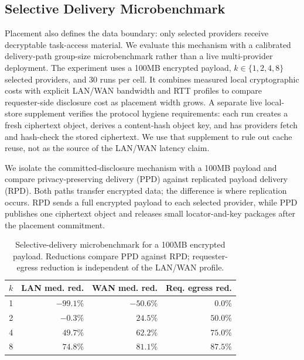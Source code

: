 \documentclass[sigplan,screen,review,anonymous]{acmart}
\begin{document}
\subsection{Selective Delivery Microbenchmark}
\label{subsec:eval-delivery}

Placement also defines the data boundary: only selected providers receive
decryptable task-access material. We evaluate this mechanism with a calibrated
delivery-path group-size microbenchmark rather than a live multi-provider
deployment. The experiment uses a 100MB encrypted payload,
\(k\in\{1,2,4,8\}\) selected providers, and 30 runs per cell. It combines
measured local cryptographic costs with explicit LAN/WAN bandwidth and RTT
profiles to compare requester-side disclosure cost as placement width grows.
A separate live local-store
supplement verifies the protocol hygiene requirements: each run creates a
fresh ciphertext object, derives a content-hash object key, and has providers
fetch and hash-check the stored ciphertext. We use that supplement to rule out
cache reuse, not as the source of the LAN/WAN latency claim.

We isolate the committed-disclosure mechanism with a 100MB payload and compare
privacy-preserving delivery (PPD) against replicated payload delivery (RPD).
Both paths transfer encrypted data; the difference is where replication
occurs. RPD sends a full encrypted payload to each selected provider, while
PPD publishes one ciphertext object and releases small locator-and-key
packages after the placement commitment.

\begin{table}[t]
\centering
\caption{Selective-delivery microbenchmark for a 100MB encrypted payload. Reductions compare PPD against RPD; requester-egress reduction is independent of the LAN/WAN profile.}
\label{tab:delivery-sweep}
\scriptsize
\setlength{\tabcolsep}{4.5pt}
\begin{tabular}{rrrr}
\toprule
\textbf{\(k\)} & \textbf{LAN med. red.} & \textbf{WAN med. red.} & \textbf{Req. egress red.} \\
\midrule
1 & \(-99.1\%\) & \(-50.6\%\) & \(0.0\%\) \\
2 & \(-0.3\%\) & \(24.5\%\) & \(50.0\%\) \\
4 & \(49.7\%\) & \(62.2\%\) & \(75.0\%\) \\
8 & \(74.8\%\) & \(81.1\%\) & \(87.5\%\) \\
\bottomrule
\end{tabular}
\end{table}
\end{document}
